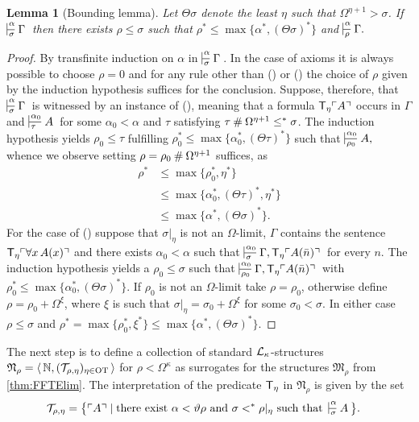 \documentclass[UKenglish,cleveref,DIV=12]{scrartcl}
\newtheorem{lemma}{Lemma}[section]
\theoremstyle{definition}
\theoremstyle{definition}
\newcommand{\gelhighlight}[1]{\highlight[magenta]{#1}}
\begin{document}
\begin{lemma}[Bounding lemma]\label{lem:T8conden}
	Let $\Theta\sigma$ denote the least $\eta$ such that $\Omega^{\eta+1}>\sigma$. 
	If\/ $\prov\alpha\sigma\Gamma$ then there exists $\rho\le\sigma$ such that
	$\rho^*\le\max\{\alpha^*, (\Theta \sigma)^* \}$ and $\prov\alpha\rho{\Gamma.}$\gelhighlight{We don't use this any more??}
\end{lemma}
\begin{proof}
By transfinite induction on \( \alpha \) in $\prov\alpha\sigma\Gamma$. 
In the case of axioms it is always possible to choose $\rho=0$ and for any rule other than (\Uni\eta) or (\Nec\eta) the choice of $\rho$ given by the induction hypothesis suffices for the conclusion. 
Suppose, therefore, that $\prov\alpha\sigma\Gamma$ is witnessed by an instance of (\Nec\eta), meaning that a formula $\mathsf{T}_\eta \ulcorner{A}\urcorner$ occurs in $\Gamma$ and $\prov{\alpha_0}\tau A$ for some $\alpha_0<\alpha$ and \( \tau \) satisfying  $\tau\mathbin{\#}\Omega^{\eta+1}\le^*\sigma$. 
The induction hypothesis yields $\rho_0\le\tau$ fulfilling $\rho_0^*\le\max\{\alpha_0^*,(\Theta \tau)^* \}$ such that
$\prov{\alpha_0}{\rho_0}{A,}$ whence we observe setting $\rho=\rho_0\mathbin{\#}\Omega^{\eta+1}$
suffices, as
\begin{align*}
  \rho^*&\le\max\{\rho_0^*,\eta^*\}\\
	&\le\max\{\alpha_0^*,(\Theta \tau)^*,\eta^*\}\\
	&\le\max\{\alpha^*, (\Theta \sigma)^* \}.
\end{align*}
For the case of (\Uni\eta) suppose that $\sigma|_\eta$ is not an $\Omega$-limit, $\Gamma$ contains the sentence
$\mathsf{T}_\eta \ulcorner{\forall x\,A(x)}\urcorner$ and there exists $\alpha_0<\alpha$ such that
$\prov{\alpha_0}\sigma{\Gamma,\T_\eta \gn{A(\bar n)} }$ for every $n$. 
The induction hypothesis yields a $\rho_0\le\sigma$ such that $\prov{\alpha_0}{\rho_0}{\Gamma,\T_\eta \gn{A(\bar n)} }$ with $\rho_0^* \le \max\{\alpha_0^*, (\Theta \sigma)^* \}$. 
If $\rho_0$ is not an $\Omega$-limit take $\rho=\rho_0$, otherwise define
$\rho=\rho_0+\Omega^\xi$, where $\xi$ is such that $\sigma|_\eta=\sigma_0+\Omega^{\xi}$ for some $\sigma_0<\sigma$.
In either case $\rho\le\sigma$ and
\( \rho^*=\max\{\rho_0^*,\xi^*\}\le\max\{\alpha^*, ( \Theta \sigma)^*\}\). 
\end{proof}

The next step is to define a collection of standard $\mathcal{L}_\kappa$-structures $\mathfrak N_\rho = \langle\, \mathbb N , ( \mathcal{T}_{\rho,\eta} )_{\eta \in \mathrm{OT} }\,\rangle $ for $\rho<\Omega^\kappa$ as surrogates for the structures $\mathfrak{M}_\rho$ from \cref{thm:FFTElim}. 
The interpretation of the predicate \( \mathsf{T}_\eta \) in \( \mathfrak N_\rho \) is given by the set
\begin{align*}
	\FF_{\rho,\eta} = \bigl\{ \gn A &\mid \text{there exist $\alpha <\vartheta\rho$ and $\sigma <^* \rho|_\eta$ such that\,  $\prov{\alpha}{\sigma}A$} \bigr\}.
\end{align*}
\end{document}
